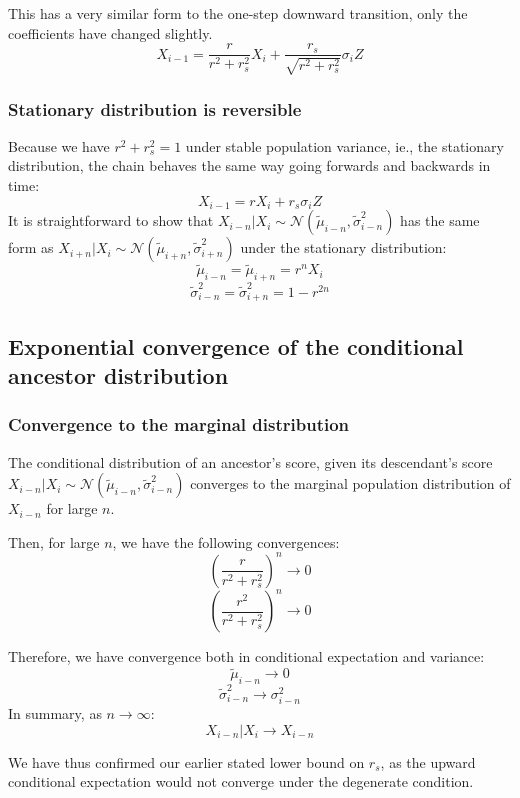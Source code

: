 \documentclass[letterpaper,10pt]{article} %
\begin{document}
This has a very similar form to the one-step downward transition, only the coefficients have changed slightly.
$$X_{i-1} = \frac{r}{r^2+r_s^2} X_i + \frac{r_s}{\sqrt{r^2+r_s^2}} \sigma_{i} Z$$


\subsubsection*{Stationary distribution is reversible}

Because we have $r^2+r_s^2 = 1$ under stable population variance, ie., the stationary distribution, the chain behaves the same way going forwards and backwards in time:
$$X_{i-1} = r X_i + r_s \sigma_{i} Z$$
It is straightforward to show that $X_{i-n}|X_i \sim \mathcal{N}( \tilde{\mu}_{i-n}, \tilde{\sigma}_{i-n}^2)$ has the same form as $X_{i+n}|X_i \sim \mathcal{N}( \tilde{\mu}_{i+n}, \tilde{\sigma}_{i+n}^2)$ under the stationary distribution:
$$\tilde{\mu}_{i-n} = \tilde{\mu}_{i+n} = r^nX_i$$
$$\tilde{\sigma}_{i-n}^2 = \tilde{\sigma}_{i+n}^2 = 1-r^{2n}$$





\subsection{Exponential convergence of the conditional ancestor distribution}

\subsubsection*{Convergence to the marginal distribution}
The conditional distribution of an ancestor's score, given its descendant's score $X_{i-n}|X_i \sim \mathcal{N}( \tilde{\mu}_{i-n}, \tilde{\sigma}_{i-n}^2)$ converges to the marginal population distribution of $X_{i-n}$ for large $n$.

Then, for large $n$, we have the following convergences:
$$(\frac{r}{r^2+r_s^2})^n \rightarrow 0$$
$$(\frac{r^2}{r^2+r_s^2})^n \rightarrow 0$$

Therefore, we have convergence both in conditional expectation and variance:
$$\tilde{\mu}_{i-n} \rightarrow 0$$
$$\tilde{\sigma}_{i-n}^2 \rightarrow \sigma_{i-n}^2$$
In summary, as $n \rightarrow \infty$:
$$X_{i-n}|X_i \rightarrow X_{i-n}$$

We have thus confirmed our earlier stated lower bound on $r_s$, as the upward conditional expectation would not converge under the degenerate condition.
\end{document}
